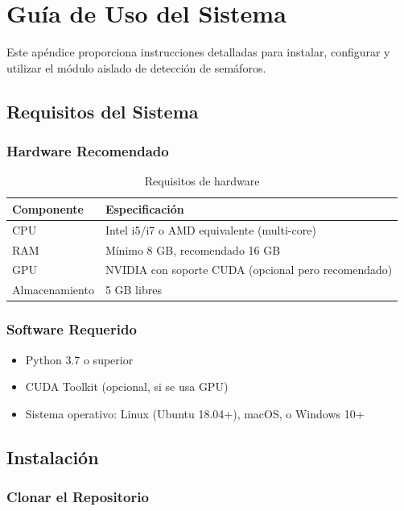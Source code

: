 \chapter{Guía de Uso del Sistema}
\label{apendice:guia_uso}

Este apéndice proporciona instrucciones detalladas para instalar, configurar y utilizar el módulo aislado de detección de semáforos.

\section{Requisitos del Sistema}

\subsection{Hardware Recomendado}

\begin{table}[H]
\centering
\begin{tabular}{|l|l|}
\hline
\textbf{Componente} & \textbf{Especificación} \\
\hline
CPU & Intel i5/i7 o AMD equivalente (multi-core) \\
RAM & Mínimo 8 GB, recomendado 16 GB \\
GPU & NVIDIA con soporte CUDA (opcional pero recomendado) \\
Almacenamiento & 5 GB libres \\
\hline
\end{tabular}
\caption{Requisitos de hardware}
\end{table}

\subsection{Software Requerido}

\begin{itemize}
    \item Python 3.7 o superior
    \item CUDA Toolkit (opcional, si se usa GPU)
    \item Sistema operativo: Linux (Ubuntu 18.04+), macOS, o Windows 10+
\end{itemize}

\section{Instalación}

\subsection{Clonar el Repositorio}

